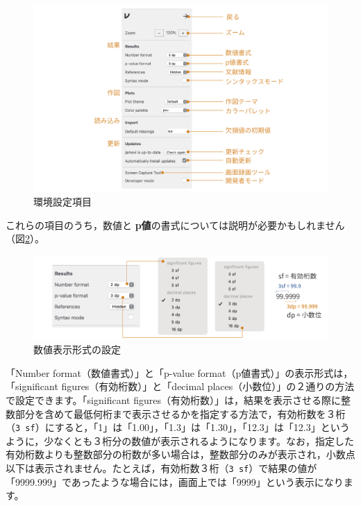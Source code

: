 \documentclass[
  12pt,
  a5jpaper,
  lualatex, ja=standard]{bxjsbook}
\renewcommand{\emph}[1]{\textbf{\color{emph} #1}}
\begin{document}
\begin{figure}[!ht]

{\centering \includegraphics[width=1\linewidth]{images/intro/options} 

}

\caption{環境設定項目}\label{fig:options-window}
\end{figure}

これらの項目のうち，数値と\emph{p値}の書式については説明が必要かもしれません（図\ref{fig:options-number-format}）。

\begin{figure}[!ht]

{\centering \includegraphics[width=1\linewidth]{images/intro/options-results} 

}

\caption{数値表示形式の設定}\label{fig:options-number-format}
\end{figure}

「Number format（数値書式）」と「p-value format（p値書式）」の表示形式は，「significant figures（有効桁数）」と「decimal places（小数位）」の２通りの方法で設定できます。「significant figures（有効桁数）」は，結果を表示させる際に整数部分を含めて最低何桁まで表示させるかを指定する方法で，有効桁数を３桁（\texttt{3\ sf}）にすると，「1」は「1.00」，「1.3」は「1.30」，「12.3」は「12.3」というように，少なくとも３桁分の数値が表示されるようになります。なお，指定した有効桁数よりも整数部分の桁数が多い場合は，整数部分のみが表示され，小数点以下は表示されません。たとえば，有効桁数３桁（\texttt{3\ sf}）で結果の値が「9999.999」であったような場合には，画面上では「9999」という表示になります。
\end{document}
